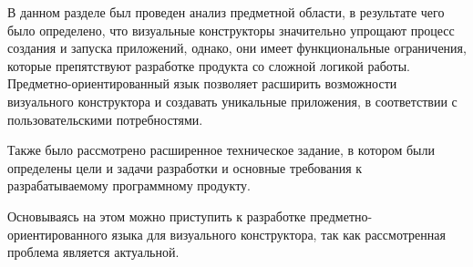 В данном разделе был проведен анализ предметной области, в результате чего было определено,
что визуальные конструкторы значительно упрощают процесс создания и запуска приложений,
однако, они имеет функциональные ограничения, которые препятствуют разработке продукта со сложной логикой работы.
Предметно-ориентированный язык позволяет расширить возможности визуального конструктора и создавать уникальные приложения,
в соответствии с пользовательскими потребностями.

Также было рассмотрено расширенное техническое задание,
в котором были определены цели и задачи разработки и основные требования к разрабатываемому программному продукту.

Основываясь на этом можно приступить к разработке предметно-ориентированного языка для визуального конструктора,
так как рассмотренная проблема является актуальной.